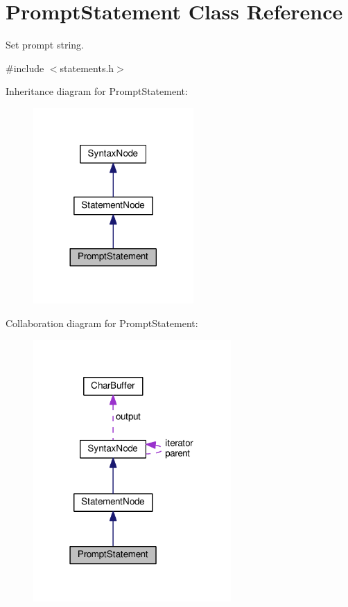 \hypertarget{classPromptStatement}{}\section{Prompt\+Statement Class Reference}
\label{classPromptStatement}


Set prompt string.  




{\ttfamily \#include $<$statements.\+h$>$}



Inheritance diagram for Prompt\+Statement\+:\nopagebreak
\begin{figure}[H]
\begin{center}
\leavevmode
\includegraphics[width=173pt]{classPromptStatement__inherit__graph}
\end{center}
\end{figure}


Collaboration diagram for Prompt\+Statement\+:\nopagebreak
\begin{figure}[H]
\begin{center}
\leavevmode
\includegraphics[width=214pt]{classPromptStatement__coll__graph}
\end{center}
\end{figure}
